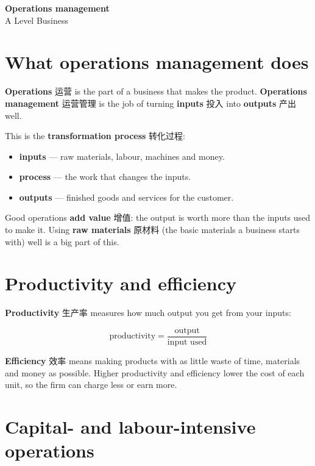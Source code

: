 \documentclass[11pt]{article}
\begin{document}
\begin{center}
  {\LARGE\bfseries Operations management}\\[0.35em]
  {\large A Level Business}
\end{center}
\vspace{0.6em}

\section*{What operations management does}

\textbf{Operations} 运营 is the part of a business that makes the product. \textbf{Operations management} 运营管理 is the job of turning \textbf{inputs} 投入 into \textbf{outputs} 产出 well.

This is the \textbf{transformation process} 转化过程:

\begin{itemize}
\item \textbf{inputs} — raw materials, labour, machines and money.

\item \textbf{process} — the work that changes the inputs.

\item \textbf{outputs} — finished goods and services for the customer.

\end{itemize}

Good operations \textbf{add value} 增值: the output is worth more than the inputs used to make it. Using \textbf{raw materials} 原材料 (the basic materials a business starts with) well is a big part of this.

\section*{Productivity and efficiency}

\textbf{Productivity} 生产率 measures how much output you get from your inputs:

\[
\text{productivity} = \frac{\text{output}}{\text{input used}}
\]

\textbf{Efficiency} 效率 means making products with as little waste of time, materials and money as possible. Higher productivity and efficiency lower the cost of each unit, so the firm can charge less or earn more.

\section*{Capital- and labour-intensive operations}
\end{document}
